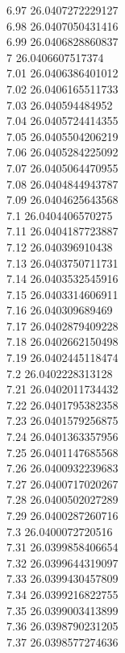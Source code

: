 {6.97	26.0407272229127\\
6.98	26.0407050431416\\
6.99	26.0406828860837\\
7	26.0406607517374\\
7.01	26.0406386401012\\
7.02	26.0406165511733\\
7.03	26.040594484952\\
7.04	26.0405724414355\\
7.05	26.0405504206219\\
7.06	26.0405284225092\\
7.07	26.0405064470955\\
7.08	26.0404844943787\\
7.09	26.0404625643568\\
7.1	26.0404406570275\\
7.11	26.0404187723887\\
7.12	26.040396910438\\
7.13	26.0403750711731\\
7.14	26.0403532545916\\
7.15	26.0403314606911\\
7.16	26.040309689469\\
7.17	26.0402879409228\\
7.18	26.0402662150498\\
7.19	26.0402445118474\\
7.2	26.0402228313128\\
7.21	26.0402011734432\\
7.22	26.0401795382358\\
7.23	26.0401579256875\\
7.24	26.0401363357956\\
7.25	26.0401147685568\\
7.26	26.0400932239683\\
7.27	26.0400717020267\\
7.28	26.0400502027289\\
7.29	26.0400287260716\\
7.3	26.0400072720516\\
7.31	26.0399858406654\\
7.32	26.0399644319097\\
7.33	26.0399430457809\\
7.34	26.0399216822755\\
7.35	26.0399003413899\\
7.36	26.0398790231205\\
7.37	26.0398577274636\\
}
